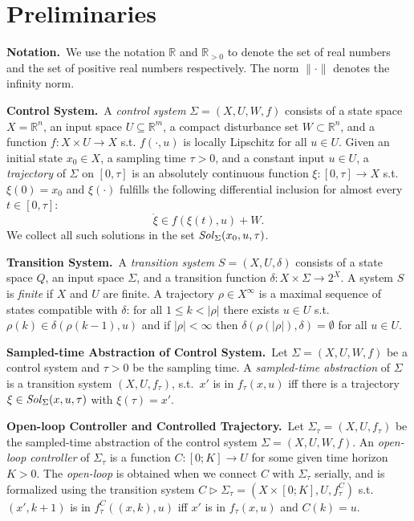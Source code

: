 
\section{Preliminaries}

\smallskip
\noindent\textbf{Notation.}\
We use the notation $\mathbb{R}$ and $\mathbb{R}_{>0}$ to denote the set of real numbers and the set of positive real numbers respectively.
The norm $\| \cdot \|$ denotes the infinity norm.

\smallskip
\noindent\textbf{Control System.}\
A \emph{control system} $\Sigma = (X, U, W, f)$
consists of a state space $X= \mathbb{R}^n$, an input space $U\subseteq\mathbb{R}^m$, 
a compact disturbance set $W\subset \mathbb{R}^n$, and 
a function $f:X\times U\rightarrow X$ s.t. $f(\cdot,u)$ is locally Lipschitz for all $u\in U$. 
%
Given an initial state $x_0\in X$, a sampling time $\tau>0$, and a constant input $u\in U$, 
a \emph{trajectory} of $\Sigma$ 
on $[0,\tau]$ is an absolutely continuous function $\xi:[0,\tau]\rightarrow X$  s.t. $\xi(0) = x_0$ and
$\xi(\cdot)$ fulfills the following differential inclusion for almost every $t\in[0,\tau]$:
\begin{equation}\label{equ:def_f}
 \dot{\xi}\in f(\xi(t),u) + W. 
\end{equation} 
We collect all such solutions in the set $\mathit{Sol}_\Sigma(x_0,u,\tau)$. 

\smallskip
\noindent\textbf{Transition System.}\
A \emph{transition system} $S=(X,U,\delta)$ consists of a state space $Q$, an input space $\Sigma$, and a transition function $\delta:X\times \Sigma \rightarrow 2^X$. 
A system $S$ is \emph{finite} if $X$ and $U$ are finite. 
A trajectory $\rho\in X^\infty$ is a maximal sequence of states compatible with $\delta$:
for all $1\leq k < |\rho|$ there exists $u\in U$ s.t.\ $\rho(k)\in \delta(\rho(k-1),u)$ and 
if $|\rho| < \infty$ then $\delta(\rho(|\rho|),\delta)= \emptyset$ for all $u\in U$.

\smallskip
\noindent\textbf{Sampled-time Abstraction of Control System.}\
Let $\Sigma = (X, U, W, f)$ be a control system and $\tau>0$ be the sampling time.
A \emph{sampled-time abstraction} of $\Sigma$ is a transition system $(X,U,f_\tau)$, s.t.\ $x'$ is in $f_\tau(x,u)$ iff there is a trajectory $\xi\in \mathit{Sol}_\Sigma(x,u,\tau)$ with $\xi(\tau)=x'$.

\smallskip
\noindent\textbf{Open-loop Controller and Controlled Trajectory.}\
Let $\Sigma_\tau=(X,U,f_\tau)$ be the sampled-time abstraction of the control system $\Sigma=(X,U,W,f)$.
An \emph{open-loop controller} of $\Sigma_\tau$ is a function $C:[0;K]\rightarrow U$ for some given time horizon $K>0$.
The \emph{open-loop} is obtained when we connect $C$ with $\Sigma_\tau$ serially, and is formalized using the transition system $C \triangleright \Sigma_\tau = (X\times [0;K],U,f_\tau^C)$ s.t.\ $(x',k+1)$ is in $f_\tau^C((x,k),u)$ iff $x'$ is in $f_\tau(x,u)$ and $C(k)=u$.

